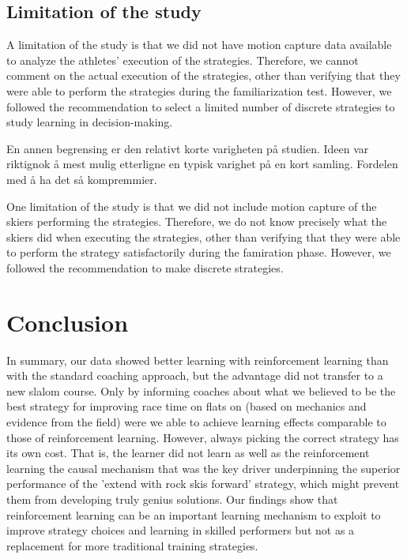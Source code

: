 \documentclass[pdflatex,sn-mathphys-num]{sn-jnl}%
\theoremstyle{thmstyleone}%
\theoremstyle{thmstyletwo}%
\theoremstyle{thmstylethree}%
\begin{document}
\subsection{Limitation of the study}
A limitation of the study is that we did not have motion capture data available to analyze the athletes' execution of the strategies. Therefore, we cannot comment on the actual execution of the strategies, other than verifying that they were able to perform the strategies during the familiarization test. However, we followed the recommendation to select a limited number of discrete strategies to study learning in decision-making.

En annen begrensing er den relativt korte varigheten på studien. Ideen var riktignok å mest mulig etterligne en typisk varighet på en kort samling. Fordelen med å ha det så kompremmier.

\cite{taylor_role_2012, taylor_flexible_2011}



One limitation of the study is that we did not include motion capture of the skiers performing the strategies. Therefore, we do not know precisely what the skiers did when executing the strategies, other than verifying that they were able to perform the strategy satisfactorily during the famiration phase. However, we followed the recommendation to make discrete strategies. 

\section{Conclusion}
In summary, our data showed better learning with reinforcement learning than with the standard coaching approach, but the advantage did not transfer to a new slalom course. Only by informing coaches about what we believed to be the best strategy for improving race time on flats on (based on mechanics and evidence from the field) were we able to achieve learning effects comparable to those of reinforcement learning. However, always picking the correct strategy has its own cost. That is, the learner did not learn as well as the reinforcement learning the causal mechanism that was the key driver underpinning the superior performance of the 'extend with rock skis forward' strategy, which might prevent them from developing truly genius solutions\cite{ericsson_scientific_1998}. Our findings show that reinforcement learning can be an important learning mechanism \cite{hasson_reinforcement_2015} to exploit to improve strategy choices and learning in skilled performers \cite{lohse_errors_2019} but not as a replacement for more traditional training strategies.
\end{document}

